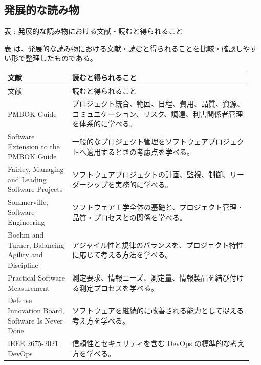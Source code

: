 \subsection{発展的な読み物}
\par\smallskip\noindent{}\label{tab:ch09-09}表 \thetable: 発展的な読み物における文献・読むと得られること\par\smallskip
表 \thetable は、発展的な読み物における文献・読むと得られることを比較・確認しやすい形で整理したものである。\par\smallskip
\begin{longtable}{>{\raggedright\arraybackslash}p{0.25\linewidth}>{\raggedright\arraybackslash}p{0.70\linewidth}}
\toprule
文献 & 読むと得られること \\
\midrule
\endfirsthead
\toprule
文献 & 読むと得られること \\
\midrule
\endhead
PMBOK Guide & プロジェクト統合、範囲、日程、費用、品質、資源、コミュニケーション、リスク、調達、利害関係者管理を体系的に学べる。 \\
Software Extension to the PMBOK Guide & 一般的なプロジェクト管理をソフトウェアプロジェクトへ適用するときの考慮点を学べる。 \\
Fairley, Managing and Leading Software Projects & ソフトウェアプロジェクトの計画、監視、制御、リーダーシップを実務的に学べる。 \\
Sommerville, Software Engineering & ソフトウェア工学全体の基礎と、プロジェクト管理・品質・プロセスとの関係を学べる。 \\
Boehm and Turner, Balancing Agility and Discipline & アジャイル性と規律のバランスを、プロジェクト特性に応じて考える方法を学べる。 \\
Practical Software Measurement & 測定要求、情報ニーズ、測定量、情報製品を結び付ける測定プロセスを学べる。 \\
Defense Innovation Board, Software Is Never Done & ソフトウェアを継続的に改善される能力として捉える考え方を学べる。 \\
IEEE 2675-2021 DevOps & 信頼性とセキュリティを含む DevOps の標準的な考え方を学べる。 \\
\bottomrule
\end{longtable}
